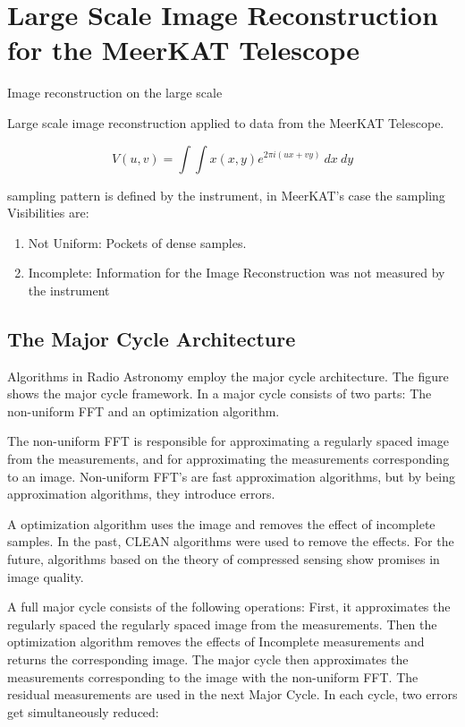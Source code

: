 \section{Large Scale Image Reconstruction for the MeerKAT Telescope} \label{intro}
Image reconstruction on the large scale

Large scale image reconstruction applied to data from the MeerKAT Telescope.

\begin{equation}\label{intro:measurement}
V(u, v) = \int\int x(x, y) e^{2 \pi i (ux+vy)} \: dx \: dy 
\end{equation}

sampling pattern is defined by the instrument, in MeerKAT's case the sampling Visibilities are:
\begin{enumerate}
	\item Not Uniform: Pockets of dense samples.
	\item Incomplete: Information for the Image Reconstruction was not measured by the instrument
\end{enumerate}


\subsection{The Major Cycle Architecture}
Algorithms in Radio Astronomy employ the major cycle architecture. The figure shows the major cycle framework. In a major cycle consists of two parts: The non-uniform FFT and an optimization algorithm. 

The non-uniform FFT is responsible for approximating a regularly spaced image from the measurements, and for approximating the measurements corresponding to an image. Non-uniform FFT's are fast approximation algorithms, but by being approximation algorithms, they introduce errors. 

A optimization algorithm uses the image and removes the effect of incomplete samples. In the past, CLEAN algorithms were used to remove the effects. For the future, algorithms based on the theory of compressed sensing show promises in image quality.

A full major cycle consists of the following operations: First, it approximates the regularly spaced the regularly spaced image from the measurements. Then the optimization algorithm removes the effects of Incomplete measurements and returns the corresponding image. The major cycle then approximates the measurements corresponding to the image with the non-uniform FFT. The residual measurements are used in the next Major Cycle. In each cycle, two errors get simultaneously reduced:

